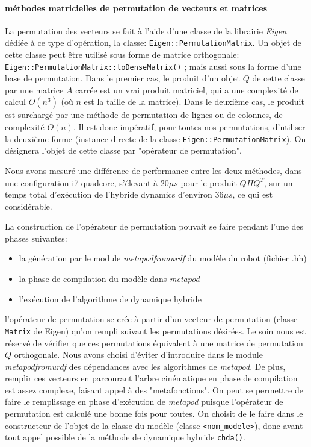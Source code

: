 \documentclass{report}
\begin{document}
\paragraph{méthodes matricielles de permutation de vecteurs et matrices}
La permutation des vecteurs se fait à l'aide d'une classe de la librairie \emph{Eigen} dédiée à ce type d'opération, la classe: \verb;Eigen::PermutationMatrix;. Un objet de cette classe peut être utilisé sous forme de matrice orthogonale: \verb;Eigen::PermutationMatrix::toDenseMatrix(); ; mais aussi sous la forme d'une base de permutation. Dans le premier cas, le produit d'un objet $Q$ de cette classe par une matrice $A$ carrée est un vrai produit matriciel, qui a une complexité de calcul $O(n^3)$ (où $n$ est la taille de la matrice). Dans le deuxième cas, le produit est surchargé par une méthode de permutation de lignes ou de colonnes, de complexité $O(n)$. Il est donc impératif, pour toutes nos permutations, d'utiliser la deuxième forme (instance directe de la classe \verb;Eigen::PermutationMatrix;). On désignera l'objet de cette classe par "opérateur de permutation".

Nous avons mesuré une différence de performance entre les deux méthodes, dans une configuration i7 quadcore, s'élevant à $20\mu s$ pour le produit $Q H Q^T$, sur un temps total d'exécution de l'hybride dynamics d'environ $36\mu s$, ce qui est considérable.

La construction de l'opérateur de permutation pouvait se faire pendant l'une des phases suivantes:
\begin{itemize}
  \item la génération par le module \emph{metapodfromurdf} du modèle du robot (fichier .hh)
  \item la phase de compilation du modèle dans \emph{metapod}
  \item l'exécution de l'algorithme de dynamique hybride
\end{itemize}
l'opérateur de permutation se crée à partir d'un vecteur de permutation (classe \verb;Matrix; de Eigen) qu'on rempli suivant les permutations désirées. Le soin nous est réservé de vérifier que ces permutations équivalent à une matrice de permutation $Q$ orthogonale. Nous avons choisi d'éviter d'introduire dans le module \emph{metapodfromurdf} des dépendances avec les algorithmes de \emph{metapod}. De plus, remplir ces vecteurs en parcourant l'arbre cinématique en phase de compilation est assez complexe, faisant appel à des "metafonctions". On peut se permettre de faire le remplissage en phase d'exécution de \emph{metapod} puisque l'opérateur de permutation est calculé une bonne fois pour toutes. On choisit de le faire dans le constructeur de l'objet de la classe du modèle (classe \verb;<nom_modele>;), donc avant tout appel possible de la méthode de dynamique hybride \verb;chda();.
\end{document}
